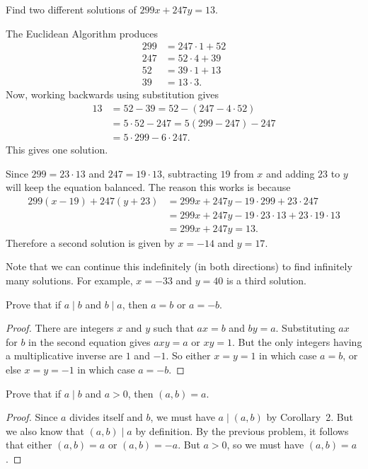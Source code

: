  Find two different solutions of $299x + 247y = 13$.
\begin{solution}
  The Euclidean Algorithm produces
  \begin{align*}
    299 &= 247\cdot1 + 52 \\
    247 &= 52\cdot4 + 39 \\
    52 &= 39\cdot1 + 13 \\
    39 &= 13\cdot3.
  \end{align*}
  Now, working backwards using substitution gives
  \begin{align*}
    13 &= 52 - 39 = 52 - (247 - 4\cdot52) \\
       &= 5\cdot52 - 247 = 5(299 - 247) - 247 \\
       &= 5\cdot299 - 6\cdot247.
  \end{align*}
  This gives one solution.

  Since $299 = 23\cdot13$ and $247 = 19\cdot13$, subtracting $19$ from
  $x$ and adding $23$ to $y$ will keep the equation
  balanced. The reason this works is because
  \begin{align*}
    299(x - 19) + 247(y + 23)
    &= 299x + 247y - 19\cdot299 + 23\cdot247 \\
    &= 299x + 247y - 19\cdot23\cdot13 + 23\cdot19\cdot13 \\
    &= 299x + 247y = 13.
  \end{align*}
  Therefore a second solution is given by $x = -14$ and $y = 17$.

  Note that we can continue this indefinitely (in both directions) to
  find infinitely many solutions. For example, $x = -33$ and $y = 40$
  is a third solution.
\end{solution}

 Prove that if $a\mid b$ and $b\mid a$, then $a = b$ or
$a = -b$.
\begin{proof}
  There are integers $x$ and $y$ such that $ax = b$ and $by =
  a$. Substituting $ax$ for $b$ in the second equation gives $axy = a$
  or $xy = 1$. But the only integers having a multiplicative inverse
  are $1$ and $-1$. So either $x = y = 1$ in which case $a = b$, or
  else $x = y = -1$ in which case $a = -b$.
\end{proof}

 Prove that if $a\mid b$ and $a > 0$, then $(a,b) = a$.
\begin{proof}
  Since $a$ divides itself and $b$, we must have $a \mid (a,b)$ by
  Corollary~2. But we also know that $(a,b)\mid a$ by definition. By
  the previous problem, it follows that either $(a,b) = a$ or
  $(a,b) = -a$. But $a > 0$, so we must have $(a,b) = a$.
\end{proof}

